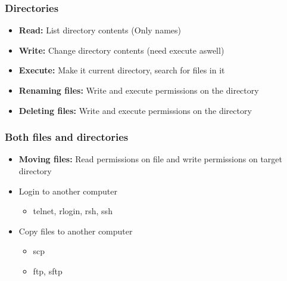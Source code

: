\documentclass{report}
\begin{document}
    \bigbreak \noindent 
    \subsubsection{Directories}
    \begin{itemize}
        \item \textbf{Read:} List directory contents (Only names)
        \item \textbf{Write:} Change directory contents (need execute aswell)
        \item \textbf{Execute:} Make it current directory, search for files in it 
        \item \textbf{Renaming files:} Write and execute permissions on the directory
        \item \textbf{Deleting files:} Write and execute permissions on the directory
    \end{itemize}

    \bigbreak \noindent 
    \subsubsection{Both files and directories}
    \begin{itemize}
        \item \textbf{Moving files:} Read permissions on file and write permissions on target directory
    \end{itemize}

    \pagebreak 

    \begin{itemize}
        \item Login to another computer 
            \begin{itemize}
                \item telnet, rlogin, rsh, ssh
            \end{itemize}
        \item Copy files to another computer 
            \begin{itemize}
                \item scp
                \item ftp, sftp
            \end{itemize}
    \end{itemize}

    \bigbreak \noindent 
\end{document}
